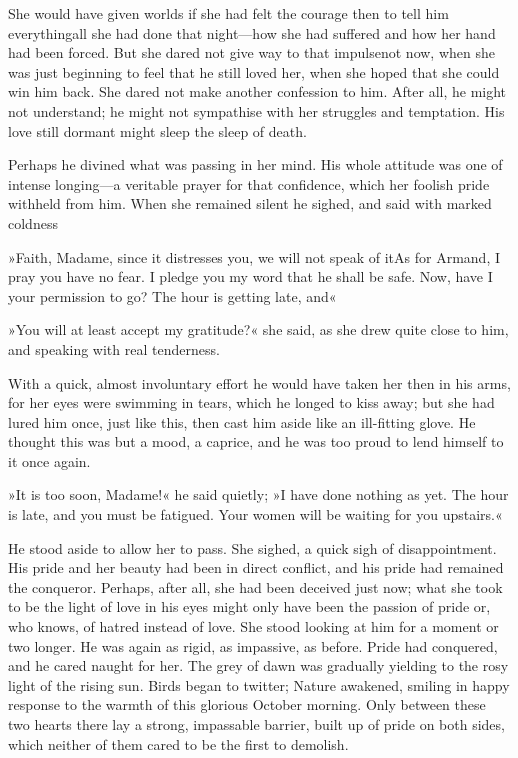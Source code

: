 She would have given worlds if she had felt the courage then to tell him everything\textellipsis \allowbreak  all she had done that night—how she had suffered and how her hand had been forced. But she dared not give way to that impulse\textellipsis \allowbreak  not now, when she was just beginning to feel that he still loved her, when she hoped that she could win him back. She dared not make another confession to him. After all, he might not understand; he might not sympathise with her struggles and temptation. His love still dormant might sleep the sleep of death.

Perhaps he divined what was passing in her mind. His whole attitude was one of intense longing—a veritable prayer for that confidence, which her foolish pride withheld from him. When she remained silent he sighed, and said with marked coldness\longdash


»Faith, Madame, since it distresses you, we will not speak of it\textellipsis \allowbreak  As for Armand, I pray you have no fear. I pledge you my word that he shall be safe. Now, have I your permission to go? The hour is getting late, and\textellipsis«

»You will at least accept my gratitude?« she said, as she drew quite close to him, and speaking with real tenderness.

With a quick, almost involuntary effort he would have taken her then in his arms, for her eyes were swimming in tears, which he longed to kiss away; but she had lured him once, just like this, then cast him aside like an ill-fitting glove. He thought this was but a mood, a caprice, and he was too proud to lend himself to it once again.

»It is too soon, Madame!« he said quietly; »I have done nothing as yet. The hour is late, and you must be fatigued. Your women will be waiting for you upstairs.«

He stood aside to allow her to pass. She sighed, a quick sigh of disappointment. His pride and her beauty had been in direct conflict, and his pride had remained the conqueror. Perhaps, after all, she had been deceived just now; what she took to be the light of love in his eyes might only have been the passion of pride or, who knows, of hatred instead of love. She stood looking at him for a moment or two longer. He was again as rigid, as impassive, as before. Pride had conquered, and he cared naught for her. The grey of dawn was gradually yielding to the rosy light of the rising sun. Birds began to twitter; Nature awakened, smiling in happy response to the warmth of this glorious October morning. Only between these two hearts there lay a strong, impassable barrier, built up of pride on both sides, which neither of them cared to be the first to demolish.

